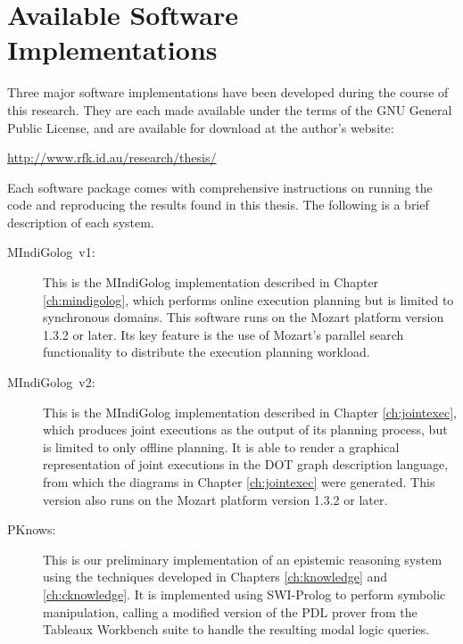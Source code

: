 

\chapter{Available Software Implementations}

\label{ch:implementation}

Three major software implementations have been developed during the course
of this research. They are each made available under the terms of
the GNU General Public License, and are available for download at
the author's website:

\begin{center}
\url{http://www.rfk.id.au/research/thesis/} 
\par\end{center}

Each software package comes with comprehensive instructions on running
the code and reproducing the results found in this thesis. The following
is a brief description of each system.

\begin{description}
\item [{{MIndiGolog~v1:}}] This is the MIndiGolog implementation described
in Chapter \ref{ch:mindigolog}, which performs online execution planning
but is limited to synchronous domains. This software runs on the Mozart
platform version 1.3.2 or later. Its key feature is the use of Mozart's
parallel search functionality to distribute the execution planning
workload. 
\item [{{MIndiGolog~v2:}}] This is the MIndiGolog implementation described
in Chapter \ref{ch:jointexec}, which produces joint executions as
the output of its planning process, but is limited to only offline
planning. It is able to render a graphical representation of joint
executions in the DOT graph description language, from which the diagrams
in Chapter \ref{ch:jointexec} were generated. This version also runs
on the Mozart platform version 1.3.2 or later. 
\item [{{PKnows:}}] This is our preliminary implementation of an epistemic
reasoning system using the techniques developed in Chapters \ref{ch:knowledge}
and \ref{ch:cknowledge}. It is implemented using SWI-Prolog to perform
symbolic manipulation, calling a modified version of the PDL prover
from the Tableaux Workbench suite \citep{abate07twb_desc} to handle
the resulting modal logic queries. 
\end{description}
